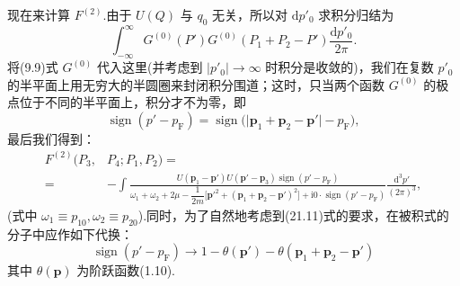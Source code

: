 现在来计算 $F^{(2)}$.由于 $U(Q)$ 与 $q_0$ 无关，所以对 $\mathrm{d}p'_0$ 求积分归结为
\begin{equation*}
  \int_{-\infty}^{\infty}G^{(0)}(P')G^{(0)}(P_1+P_2-P')\frac{\mathrm{d}p'_0}{2\pi}.
\end{equation*}
将(9.9)式 $G^{(0)}$ 代入这里(并考虑到 $|p'_0|\to\infty$ 时积分是收敛的)，我们在复数 $p'_0$ 的半平面上用无穷大的半圆圈来封闭积分围道；这时，只当两个函数 $G^{(0)}$ 的极点位于不同的半平面上，积分才不为零，即
\begin{equation}
  \operatorname{sign}(p'-p_{\mathrm{F}})=\operatorname{sign}\bigl(\bigl|\bm{p}_1+\bm{p}_2-\bm{p}'\bigr|-p_{\mathrm{F}}\bigr),
\end{equation}
最后我们得到：
\begin{equation}
\begin{aligned}
  F^{(2)}(P_3,&P_4;P_1,P_2)=\\
  ={}&-\int\frac{U(\bm{p}_1-\bm{p}')U(\bm{p}'-\bm{p}_3)\operatorname{sign}(p'-p_{\mathrm{F}})}
  {\omega_1+\omega_2+2\mu-\dfrac{1}{2m}\bigl[\bm{p}'^2+(\bm{p}_1+\bm{p}_2-\bm{p}')^2\bigr]+\mathrm{i}0\cdot\operatorname{sign}(p'-p_{\mathrm{F}})}
  \frac{\mathrm{d}^3p'}{(2\pi)^3},
\end{aligned}
\end{equation}
(式中 $\omega_1\equiv p_{10},\omega_2\equiv p_{20}$).同时，为了自然地考虑到(21.11)式的要求，在被积式的分子中应作如下代换：
\begin{equation*}
  \operatorname{sign}(p'-p_{\mathrm{F}})\to1-\theta(\bm{p}')-\theta(\bm{p}_1+\bm{p}_2-\bm{p}')
\end{equation*}
其中 $\theta(\bm p)$ 为阶跃函数(1.10).

